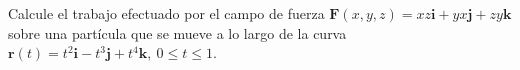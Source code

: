 \item Calcule el trabajo efectuado por el campo de fuerza $\mathbf{F}(x, y, z) = xz \mathbf{i} + yx \mathbf{j} + zy \mathbf{k}$ sobre una partícula que se mueve a lo largo de la curva $\mathbf{r}(t) = t^2 \mathbf{i} - t^3 \mathbf{j} + t^4 \mathbf{k}, \ 0 \le t \le 1$.

